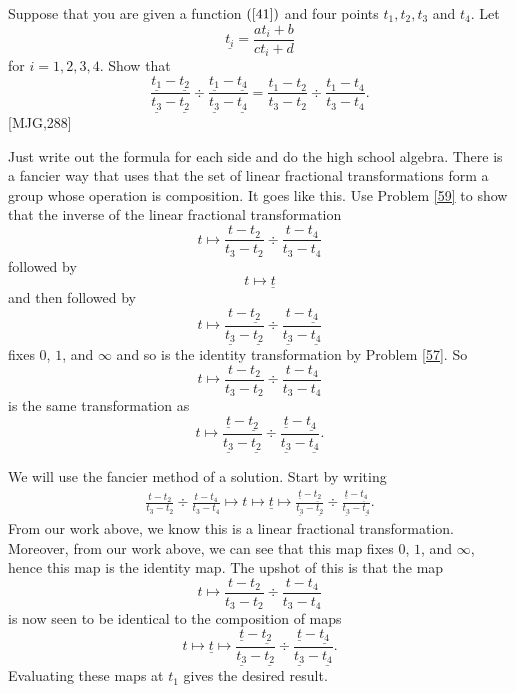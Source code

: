 \documentclass{ximera}
\begin{document}
\begin{problem}
\label{42}Suppose that you are given a function $\left(  \ref{41}\right)  $
and four points $t_{1},t_{2},t_{3}$ and $t_{4}$. Let
\[
\underline{t_{i}}=\frac{at_{i}+b}{ct_{i}+d}%
\]
for $i=1,2,3,4$. Show that%
\[
\frac{\underline{t_{1}}-\underline{t_{2}}}{\underline{t_{3}}-\underline{t_{2}%
}}\div\frac{\underline{t_{1}}-\underline{t_{4}}}{\underline{t_{3}}%
-\underline{t_{4}}}=\frac{t_{1}-t_{2}}{t_{3}-t_{2}}\div\frac{t_{1}-t_{4}%
}{t_{3}-t_{4}}.
\]
[MJG,288]

\begin{hint}
Just write out the formula for each side and do the high school
algebra.  There is a fancier way that uses that the set of linear
fractional transformations form a group whose operation is
composition. It goes like this. Use Problem \ref{59} to show that the
inverse of the linear fractional transformation
\[
t\mapsto\frac{t-t_{2}}{t_{3}-t_{2}}\div\frac{t-t_{4}}{t_{3}-t_{4}}%
\]
followed by%
\[
t\mapsto\underline{t}%
\]
and then followed by
\[
t\mapsto\frac{t-\underline{t_{2}}}{\underline{t_{3}}-\underline{t_{2}}}%
\div\frac{t-\underline{t_{4}}}{\underline{t_{3}}-\underline{t_{4}}}%
\]
fixes $0$, $1$, and $\infty$ and so is the identity transformation by Problem
\ref{57}. So%
\[
t\mapsto\frac{t-t_{2}}{t_{3}-t_{2}}\div\frac{t-t_{4}}{t_{3}-t_{4}}%
\]
is the same transformation as%
\[
t\mapsto\frac{\underline{t}-\underline{t_{2}}}{\underline{t_{3}}%
-\underline{t_{2}}}\div\frac{\underline{t}-\underline{t_{4}}}{\underline
{t_{3}}-\underline{t_{4}}}.
\]
\end{hint}
\begin{freeResponse}
We will use the fancier method of a solution. Start by writing
\begin{align*}
\frac{t-t_2}{t_3-t_2} \div \frac{t-t_4}{t_3-t_4}\mapsto t\mapsto \underline{t}\mapsto \frac{\underline{t}-\underline{t_{2}}}{\underline{t_{3}}%
-\underline{t_{2}}}\div\frac{\underline{t}-\underline{t_{4}}}{\underline
{t_{3}}-\underline{t_{4}}}.
\end{align*}
From our work above, we know this is a linear fractional
transformation. Moreover, from our work above, we can see that this
map fixes $0$, $1$, and $\infty$, hence this map is the identity
map. The upshot of this is that the map
\[
t\mapsto \frac{t-t_2}{t_3-t_2} \div \frac{t-t_4}{t_3-t_4}
\]
is now seen to be identical to the composition of maps
\[
t\mapsto \underline{t}\mapsto \frac{\underline{t}-\underline{t_{2}}}{\underline{t_{3}}%
-\underline{t_{2}}}\div\frac{\underline{t}-\underline{t_{4}}}{\underline
{t_{3}}-\underline{t_{4}}}.
\]
Evaluating these maps at $t_1$ gives the desired result. 
\end{freeResponse}
\end{problem}
\end{document}
